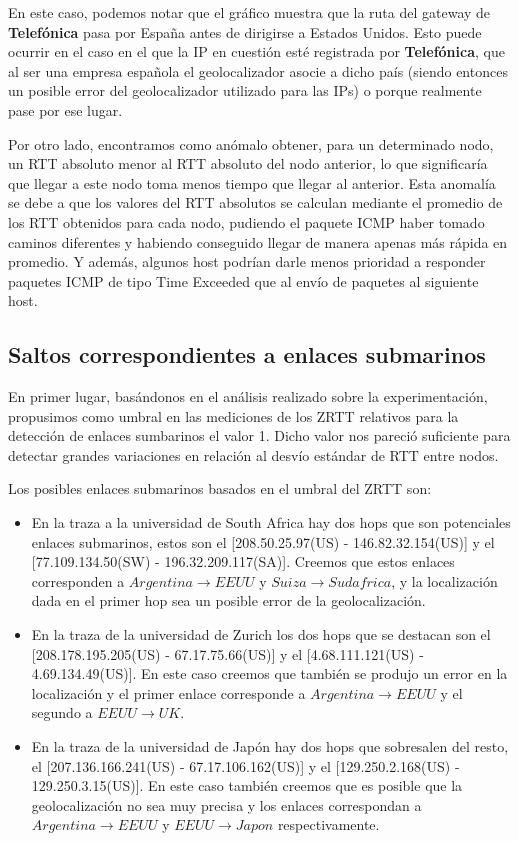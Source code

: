 \documentclass[10pt, a4paper]{article}
\begin{document}
En este caso, podemos notar que el gráfico muestra que la ruta del gateway de \textbf{Telefónica} pasa por España antes de dirigirse a Estados Unidos. Esto puede ocurrir en el caso en el que la IP en cuestión esté registrada por \textbf{Telefónica}, que al ser una empresa española el geolocalizador asocie a dicho país (siendo entonces un posible error del geolocalizador utilizado para las IPs) o porque realmente pase por ese lugar.

Por otro lado, encontramos como anómalo obtener, para un determinado nodo, un RTT absoluto menor al RTT absoluto del nodo anterior, lo que significaría que llegar a este nodo toma menos tiempo que llegar al anterior. Esta anomalía se debe a que los valores del RTT absolutos se calculan mediante el promedio de los RTT obtenidos para cada nodo, pudiendo el paquete ICMP haber tomado caminos diferentes y habiendo conseguido llegar de manera apenas más rápida en promedio. Y además, algunos host podrían darle menos prioridad a responder paquetes ICMP de tipo Time Exceeded que al envío de paquetes al siguiente host.

\subsection{Saltos correspondientes a enlaces submarinos}

En primer lugar, basándonos en el análisis realizado sobre la experimentación, propusimos como umbral en las mediciones de los ZRTT relativos para la detección de enlaces sumbarinos el valor 1. Dicho valor nos pareció suficiente para detectar grandes variaciones en relación al desvío estándar de RTT entre nodos.

Los posibles enlaces submarinos basados en el umbral del ZRTT son:
\begin{itemize}
\item En la traza a la universidad de South Africa hay dos hops que son potenciales enlaces submarinos, estos son el [208.50.25.97(US) - 146.82.32.154(US)] y el [77.109.134.50(SW) - 196.32.209.117(SA)]. Creemos que estos enlaces corresponden a $Argentina \rightarrow EEUU$ y $Suiza \rightarrow Sudafrica$, y la localización dada en el primer hop sea un posible error de la geolocalización.

\item En la traza de la universidad de Zurich los dos hops que se destacan son el [208.178.195.205(US) - 67.17.75.66(US)] y el [4.68.111.121(US) - 4.69.134.49(US)]. En este caso creemos que también se produjo un error en la localización y el primer enlace corresponde a $Argentina \rightarrow EEUU$  y el segundo a $EEUU \rightarrow UK$.

\item En la traza de la universidad de Japón hay dos hops que sobresalen del resto, el [207.136.166.241(US) - 67.17.106.162(US)] y el [129.250.2.168(US) - 129.250.3.15(US)]. En este caso también creemos que es posible que la geolocalización no sea muy precisa y los enlaces correspondan a $Argentina \rightarrow EEUU$ y $EEUU \rightarrow Japon$ respectivamente.
\end{itemize}
\end{document}
